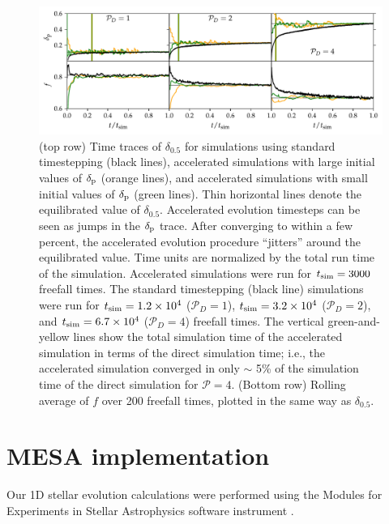\documentclass[twocolumn]{aastex631}
\newcommand{\delp}{\ensuremath{\delta_{\rm{p}}}}
\newcommand{\mP}{\ensuremath{\mathcal{P}}}
\begin{document}
\begin{figure}[t]
\centering
\includegraphics[width=\textwidth]{AE_time_figure.pdf}
\caption{
\label{fig:AE_time_figure}
(top row) Time traces of $\delta_{0.5}$ for simulations using standard timestepping (black lines), accelerated simulations with large initial values of $\delp$ (orange lines), and accelerated simulations with small initial values of $\delp$ (green lines).
Thin horizontal lines denote the equilibrated value of $\delta_{0.5}$.
Accelerated evolution timesteps can be seen as jumps in the $\delp$ trace.
After converging to within a few percent, the accelerated evolution procedure ``jitters'' around the equilibrated value.
Time units are normalized by the total run time of the simulation.
Accelerated simulations were run for $t_{\rm{sim}} = 3000$ freefall times.
The standard timestepping (black line) simulations were run for $t_{\rm{sim}} = 1.2 \times 10^4$ ($\mP_D = 1$), $t_{\rm{sim}} = 3.2 \times 10^4$ ($\mP_D = 2$), and $t_{\rm{sim}} = 6.7 \times 10^4$ ($\mP_D = 4$) freefall times.
The vertical green-and-yellow lines show the total simulation time of the accelerated simulation in terms of the direct simulation time; i.e., the accelerated simulation converged in only $\sim$ 5\% of the simulation time of the direct simulation for $\mP = 4$.
(Bottom row) Rolling average of $f$ over 200 freefall times, plotted in the same way as $\delta_{0.5}$.
}
\end{figure}





\section{MESA implementation}
\label{app:mesa}

Our 1D stellar evolution calculations were performed using the Modules for Experiments in Stellar Astrophysics software instrument \citep[MESA]{paxton_etal_2011, paxton_etal_2013, paxton_etal_2015, paxton_etal_2018, paxton_etal_2019}.
\end{document}
